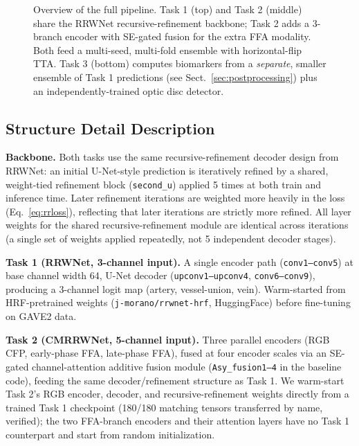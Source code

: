 \documentclass[runningheads]{llncs}
\begin{document}
\begin{figure}[t]
{%
}
\caption{Overview of the full pipeline. Task 1 (top) and Task 2 (middle) share
the RRWNet recursive-refinement backbone; Task 2 adds a 3-branch encoder with
SE-gated fusion for the extra FFA modality. Both feed a multi-seed,
multi-fold ensemble with horizontal-flip TTA. Task 3 (bottom) computes
biomarkers from a \emph{separate}, smaller ensemble of Task 1 predictions
(see Sect.~\ref{sec:postprocessing}) plus an independently-trained optic disc
detector.}
\label{fig:pipeline}
\end{figure}

\subsection{Structure Detail Description}

\textbf{Backbone.} Both tasks use the same recursive-refinement decoder
design from RRWNet: an initial U-Net-style prediction is iteratively refined
by a shared, weight-tied refinement block (\texttt{second\_u}) applied 5
times at both train and inference time. Later refinement iterations are
weighted more heavily in the loss (Eq.~\ref{eq:rrloss}), reflecting that
later iterations are strictly more refined. All layer weights for the shared
recursive-refinement module are identical across iterations (a single set of
weights applied repeatedly, not 5 independent decoder stages).

\textbf{Task 1 (RRWNet, 3-channel input).} A single encoder path
(\texttt{conv1--conv5}) at base channel width 64, U-Net decoder
(\texttt{upconv1--upconv4}, \texttt{conv6--conv9}), producing a 3-channel
logit map (artery, vessel-union, vein). Warm-started from HRF-pretrained
weights (\texttt{j-morano/rrwnet-hrf}, HuggingFace) before fine-tuning on
GAVE2 data.

\textbf{Task 2 (CMRRWNet, 5-channel input).} Three parallel encoders (RGB
CFP, early-phase FFA, late-phase FFA), fused at four encoder scales via an
SE-gated channel-attention additive fusion module (\texttt{Asy\_fusion1--4}
in the baseline code), feeding the same decoder/refinement structure as Task
1. We warm-start Task 2's RGB encoder, decoder, and recursive-refinement
weights directly from a trained Task 1 checkpoint (180/180 matching tensors
transferred by name, verified); the two FFA-branch encoders and their
attention layers have no Task 1 counterpart and start from random
initialization.
\end{document}
